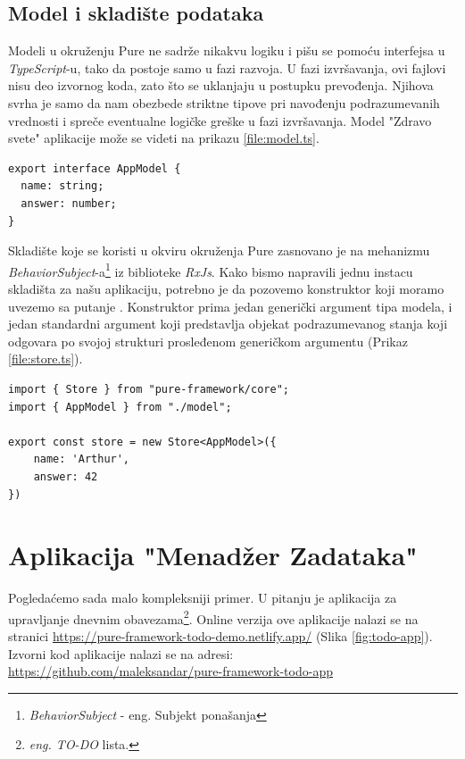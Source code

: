 \documentclass[12pt,oneside]{memoir}
\newcommand{\code}[1]{\colorbox{codegray}{\texttt{\scalebox{0.9}{#1}}}}%
\begin{document}
\subsection{Model i skladište podataka}
Modeli u okruženju Pure ne sadrže nikakvu logiku i pišu se pomoću interfejsa u \emph{TypeScript}-u, tako da postoje samo u fazi razvoja.
U fazi izvršavanja, ovi fajlovi nisu deo izvornog koda, zato što se uklanjaju u postupku prevođenja.
Njihova svrha je samo da nam obezbede striktne tipove pri navođenju podrazumevanih vrednosti i spreče eventualne logičke greške u fazi izvršavanja.
Model "Zdravo svete" aplikacije može se videti na prikazu \ref{file:model.ts}.
\begin{lstlisting}[style=jsStyle, caption={Fajl \code{src/model.ts}},label=file:model.ts]
export interface AppModel {
  name: string;
  answer: number;
} 
\end{lstlisting}
Skladište koje se koristi u okviru okruženja Pure zasnovano je na mehanizmu
\emph{BehaviorSubject}-a\footnote{\emph{BehaviorSubject} - eng. Subjekt ponašanja} iz biblioteke \emph{RxJs}. 
Kako bismo napravili jednu instacu skladišta za našu aplikaciju, potrebno je da pozovemo konstruktor \code{Store<T>}
koji moramo uvezemo sa putanje \code{"pure-framework/core"}. Konstruktor \code{Store<T>} prima jedan generički argument tipa modela,
i jedan standardni argument koji predstavlja objekat podrazumevanog stanja koji odgovara po svojoj strukturi prosleđenom generičkom argumentu (Prikaz \ref{file:store.ts}).

\begin{lstlisting}[style=jsStyle, caption={Fajl \code{src/model.ts}},label=file:store.ts]
import { Store } from "pure-framework/core";
import { AppModel } from "./model";

export const store = new Store<AppModel>({
    name: 'Arthur',
    answer: 42
})
\end{lstlisting}

\section{Aplikacija "Menadžer Zadataka"}
Pogledaćemo sada malo kompleksniji primer.
U pitanju je aplikacija za upravljanje dnevnim obavezama\footnote{\emph{eng. TO-DO} lista.}.
Online verzija ove aplikacije nalazi se na stranici
\url{https://pure-framework-todo-demo.netlify.app/} (Slika \ref{fig:todo-app}).
Izvorni kod aplikacije nalazi se na adresi: 
\\\url{https://github.com/maleksandar/pure-framework-todo-app}
\end{document}

